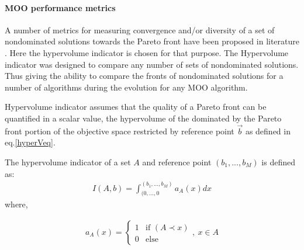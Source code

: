 \paragraph{MOO performance metrics}
A number of metrics for measuring convergence and/or diversity of a set of nondominated solutions towards the Pareto front have been proposed in literature \cite{deb01}. Here the hypervolume indicator \cite{zbt2007a} is chosen for that purpose. The Hypervolume indicator was designed to compare any number of sets of nondominated solutions. Thus giving the ability to compare the fronts of nondominated solutions for a number of algorithms during the evolution for any MOO algorithm. 

Hypervolume indicator assumes that the quality of a Pareto front can be quantified in a scalar value, the hypervolume of the dominated by the Pareto front portion of the objective space restricted by reference point $\vec{b}$ as defined in eq.\ref{hyperVeq}. 

The hypervolume indicator of a set $A$  and reference point $(b_1,...,b_M)$ is defined as:
\begin{eqnarray}
	I(A,b)=\int _{(0,...,0}^{(b_1,...,b_M)}a_A(x)dx 
\label{hyperVeq}
\end{eqnarray}  
where,

\begin{eqnarray}
	\nonumber
	a_A(x) = \left\{ \begin{array}{ll}
    1 & \mbox{if $(A\prec{x})$}\\
    0 & \mbox{else}\end{array} \right.
    ,~x\in A
\end{eqnarray}    


